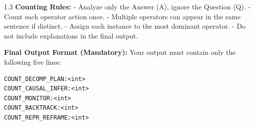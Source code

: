 \begin{tcolorbox}
\begin{spacing}{1.3}
\textbf{Counting Rules:}  
- Analyze only the Answer (A), ignore the Question (Q).  
- Count each operator action once.  
- Multiple operators can appear in the same sentence if distinct.  
- Assign each instance to the most dominant operator.  
- Do not include explanations in the final output.  

\textbf{Final Output Format (Mandatory):}  
Your output must contain only the following five lines:

\begin{verbatim}
COUNT_DECOMP_PLAN:<int>
COUNT_CAUSAL_INFER:<int>
COUNT_MONITOR:<int>
COUNT_BACKTRACK:<int>
COUNT_REPR_REFRAME:<int>
\end{verbatim}
\end{spacing}
\end{tcolorbox}